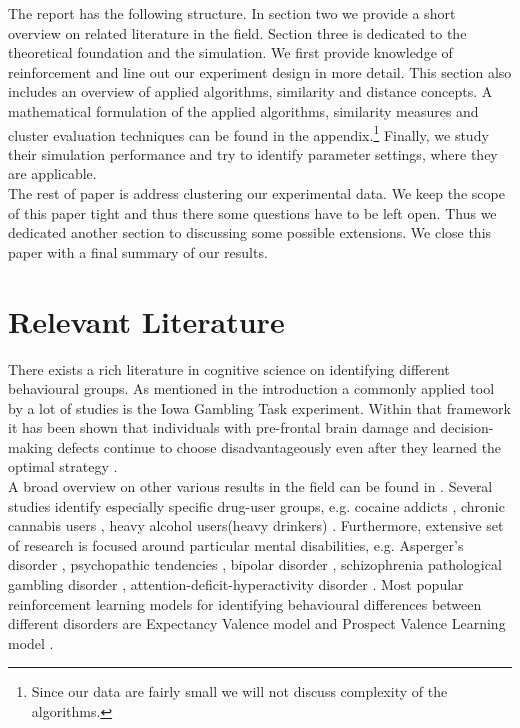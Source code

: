 \documentclass[12pt,a4paper,bibliography=totocnumbered,listof=totocnumbered]{scrartcl}
\begin{document}
The report has the following structure. In section two we provide a short overview on related literature in the field. Section three is dedicated to the theoretical foundation and the simulation. We first provide knowledge of reinforcement and line out our experiment design in more detail. This section also includes an overview of applied algorithms, similarity and distance concepts. A mathematical formulation of the applied algorithms, similarity measures and cluster evaluation techniques can be found in the appendix.\footnote{Since our data are fairly small we will not discuss complexity of the algorithms.} Finally, we study their simulation performance and try to identify parameter settings, where they are applicable.\\ 
The rest of paper is address clustering our experimental data. We keep the scope of this paper tight and thus there some questions have to be left open. Thus we dedicated another section to discussing some possible extensions. We close this paper with a final summary of our results.



\section{Relevant Literature}

There exists a rich literature in cognitive science on identifying different behavioural groups. As mentioned in the introduction a commonly applied tool by a lot of studies is the Iowa Gambling Task experiment. Within that framework it has been shown that individuals with pre-frontal brain damage and decision-making defects continue to choose disadvantageously even after they learned the optimal strategy \cite{Bechara1997}.\\
A broad overview on other various results in the field can be found in \cite{Steingroever2013}. Several studies identify especially specific drug-user groups, e.g. cocaine addicts \cite{Stout2004}, chronic cannabis users \cite{Fridberg2010}, heavy alcohol users(heavy drinkers) \cite{Gullo2011}. Furthermore, extensive set of research is focused around particular mental disabilities, e.g. Asperger's disorder \cite{Johnson2006}, psychopathic tendencies \cite{Blair2001}, bipolar disorder \cite{Brambilla2012}, schizophrenia \cite{Martino2007} pathological gambling disorder \cite{Cavedini2002}, attention-deficit-hyperactivity disorder \cite{NiritAgay2010}. Most popular reinforcement learning models for identifying behavioural differences between different disorders are Expectancy Valence model \cite{Busemeyer2002} and Prospect Valence Learning model \cite{Ahn2008}.
\end{document}
